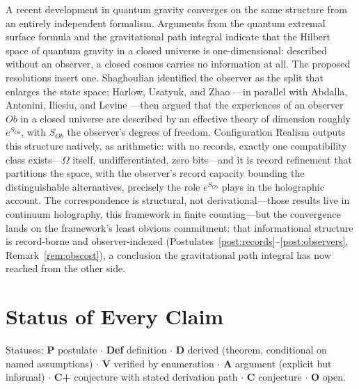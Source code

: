 \documentclass[11pt]{article}
\theoremstyle{definition}
\theoremstyle{remark}
\begin{document}
A recent development in quantum gravity converges on the same structure from an entirely independent formalism. Arguments from the quantum extremal surface formula and the gravitational path integral indicate that the Hilbert space of quantum gravity in a closed universe is one-dimensional: described without an observer, a closed cosmos carries no information at all. The proposed resolutions insert one. Shaghoulian \cite{Shaghoulian2023} identified the observer as the split that enlarges the state space; Harlow, Usatyuk, and Zhao \cite{HUZ2025}---in parallel with Abdalla, Antonini, Iliesiu, and Levine \cite{AAIL2025}---then argued that the experiences of an observer $Ob$ in a closed universe are described by an effective theory of dimension roughly $e^{S_{Ob}}$, with $S_{Ob}$ the observer's degrees of freedom. Configuration Realism outputs this structure natively, as arithmetic: with no records, exactly one compatibility class exists---$\Omega$ itself, undifferentiated, zero bits---and it is record refinement that partitions the space, with the observer's record capacity bounding the distinguishable alternatives, precisely the role $e^{S_{Ob}}$ plays in the holographic account. The correspondence is structural, not derivational---those results live in continuum holography, this framework in finite counting---but the convergence lands on the framework's least obvious commitment: that informational structure is record-borne and observer-indexed (Postulates~\ref{post:records}--\ref{post:observers}, Remark~\ref{rem:obscost}), a conclusion the gravitational path integral has now reached from the other side.

\section{Status of Every Claim}\label{sec:ledger}
Statuses: \textbf{P} postulate $\cdot$ \textbf{Def} definition $\cdot$ \textbf{D} derived (theorem, conditional on named assumptions) $\cdot$ \textbf{V} verified by enumeration $\cdot$ \textbf{A} argument (explicit but informal) $\cdot$ \textbf{C+} conjecture with stated derivation path $\cdot$ \textbf{C} conjecture $\cdot$ \textbf{O} open.
\end{document}
